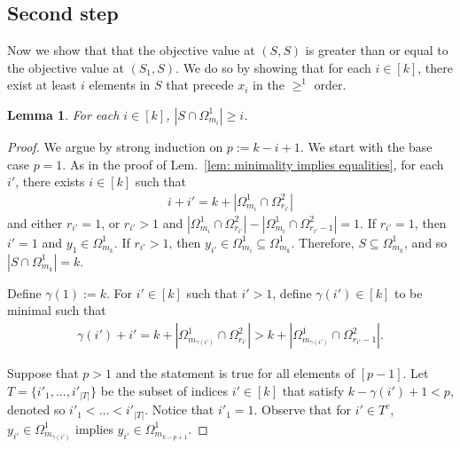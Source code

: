 \documentclass[12pt]{article}
\newtheorem{lem}[thm]{Lemma}
\theoremstyle{definition}
\numberwithin{equation}{section}
\numberwithin{equation}{section}
\newcommand{\ga}{\gamma}
\newcommand{\Og}{\Omega}
\begin{document}
\subsection{Second step}
\label{subsubsec: second}
Now we show that that the objective value at \((S, S)\) is greater than or equal to the objective value at \((S_1, S)\). We do so by showing that for each \(i \in [k]\), there exist at least \(i\) elements in \(S\) that precede \(x_i\) in the \(\geq^1\) order. 


\begin{lem}
\label{lem: the other foot}
For each \(i \in [k]\), \(| S \cap \Og^1_{m_i}| \geq i\).    
\end{lem}
\begin{proof}
We argue by strong induction on \(p := k - i +1\). We start with the base case \(p=1\). As in the proof of Lem.~\ref{lem: minimality implies equalities}, for each \(i'\), there exists \(i \in [k]\) such that 
\begin{gather}
 i + i' = k + | \Og^1_{m_i} \cap \Og^2_{r_{i'}}|   
\end{gather}
and either \(r_{i'} = 1\), or \(r_{i'} > 1\) and \(| \Og^1_{m_i} \cap \Og^2_{r_{i'}}| -  | \Og^1_{m_i} \cap \Og^2_{r_{i'}-1}| = 1\). If \(r_{i'} = 1\), then \(i'=1\) and \(y_{1} \in \Og^1_{m_k}\). If \(r_{i'} > 1\), then \(y_{i'} \in \Og^1_{m_{i}} \subseteq \Og^1_{m_k}\). Therefore, \(S \subseteq \Og^1_{m_k}\), and so \(| S \cap \Og^1_{m_k}| = k\).






Define \(\ga(1) := k\). For \(i' \in [k]\) such that \(i' > 1\), define \(\ga(i') \in [k]\) to be minimal such that 
\begin{gather}
\ga(i') + i' = k + | \Og^1_{m_{\ga(i')}} \cap \Og^2_{r_{i'}}| > k + | \Og^1_{m_{\ga(i')}} \cap \Og^2_{r_{i'}-1}|.
\end{gather}


Suppose that \(p > 1\) and the statement is true for all elements of \([p-1]\). Let \(T = \{ i'_1, \ldots, i'_{|T|}\}\) be the subset of indices \(i' \in [k]\) that satisfy \(k-\ga(i')+1 < p\), denoted so \(i'_1 < \ldots < i'_{|T|}\). Notice that \(i'_1 = 1\). Observe that for \(i' \in T^c\), \(y_{i'} \in \Og^1_{m_{\ga(i')}}\) implies   \(y_{i'} \in \Og^1_{m_{k-p+1}}\). 


\end{proof}
\end{document}
